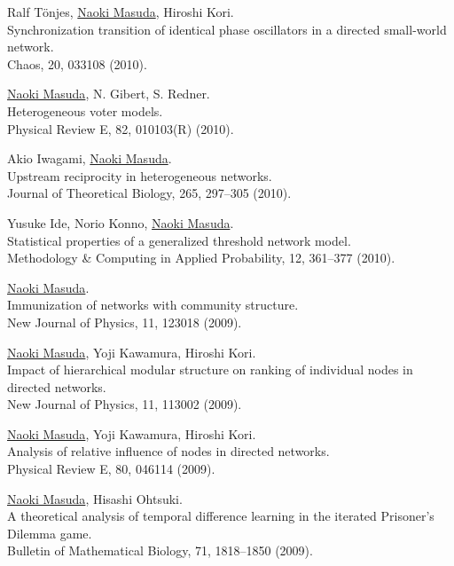 \documentclass[11pt,letter]{article}
\begin{document}
\begin{etaremune}
\item Ralf T\"{o}njes, \underline{Naoki Masuda}, Hiroshi Kori.\\
Synchronization transition of identical phase oscillators in a directed small-world network.\\
Chaos, 20, 033108 (2010).

\item \underline{Naoki Masuda}, N. Gibert, S. Redner.\\
Heterogeneous voter models.\\
Physical Review E, 82, 010103(R) (2010).

\item Akio Iwagami, \underline{Naoki Masuda}.\\
Upstream reciprocity in heterogeneous networks.\\
Journal of Theoretical Biology, 265, 297--305 (2010).

\item Yusuke Ide, Norio Konno, \underline{Naoki Masuda}.\\
Statistical properties of a generalized threshold network model.\\
Methodology \& Computing in Applied Probability, 12, 361--377 (2010).

\item \underline{Naoki Masuda}.\\
Immunization of networks with community structure.\\
New Journal of Physics, 11, 123018 (2009).

\item \underline{Naoki Masuda}, Yoji Kawamura, Hiroshi Kori.\\
Impact of hierarchical modular structure on ranking of individual nodes in directed networks.\\
New Journal of Physics, 11, 113002 (2009).

\item \underline{Naoki Masuda}, Yoji Kawamura, Hiroshi Kori.\\
Analysis of relative influence of nodes in directed networks.\\
Physical Review E, 80, 046114 (2009).

\item \underline{Naoki Masuda}, Hisashi Ohtsuki.\\
A theoretical analysis of temporal difference learning in the iterated Prisoner's Dilemma game.\\
Bulletin of Mathematical Biology, 71, 1818--1850 (2009).


\end{etaremune}
\end{document}
